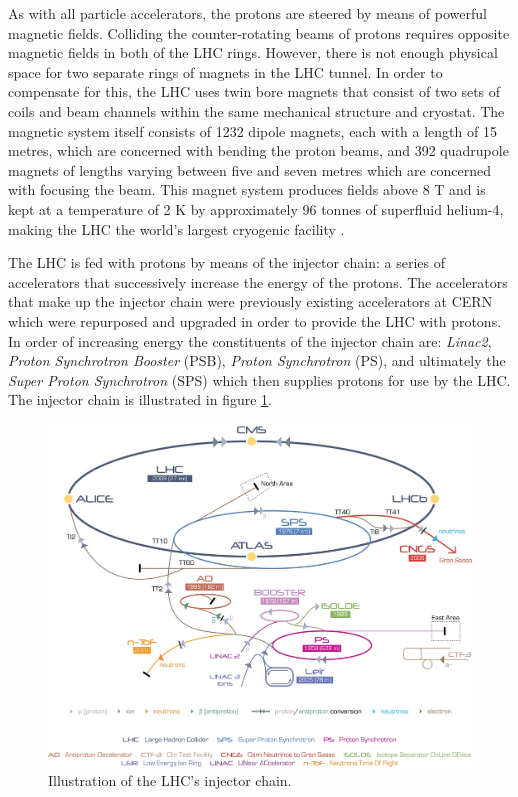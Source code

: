 As with all particle accelerators, the protons are steered by means of powerful magnetic fields. Colliding the counter-rotating beams of protons requires opposite magnetic fields in both of the LHC rings. However, there is not enough physical space for two separate rings of magnets in the LHC tunnel. In order to compensate for this, the LHC uses twin bore magnets that consist of two sets of coils and beam channels within the same mechanical structure and cryostat. The magnetic system itself consists of 1232 dipole magnets, each with a length of 15 metres, which are concerned with bending the proton beams, and 392 quadrupole magnets of lengths varying between five and seven metres which are concerned with focusing the beam. This magnet system produces fields above 8 T and is kept at a temperature of 2 K by approximately 96 tonnes of superfluid helium-4, making the LHC the world's largest cryogenic facility \cite{cryo}.

The LHC is fed with protons by means of the injector chain: a series of accelerators that successively increase the energy of the protons. The accelerators that make up the injector chain were previously existing accelerators at CERN which were repurposed and upgraded in order to provide the LHC with protons. In order of increasing energy the constituents of the injector chain are: \emph{Linac2}, \emph{Proton Synchrotron Booster} (PSB), \emph{Proton Synchrotron} (PS), and ultimately the \emph{Super Proton Synchrotron} (SPS) which then supplies protons for use by the LHC. The injector chain is illustrated in figure \ref{lhc_injectors_image}.

\begin{figure}
\centering
\includegraphics[width=.93\textwidth]{images/lhc_injectors.png}
\caption{Illustration of the LHC's injector chain. \cite{lhc_injector_image}}
\label{lhc_injectors_image}
\end{figure}